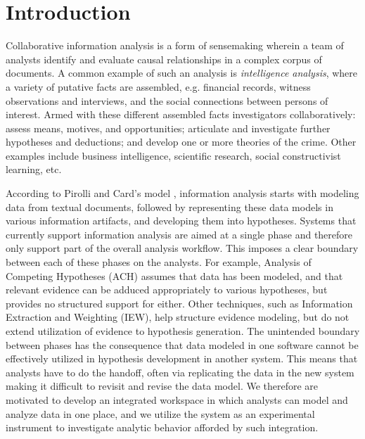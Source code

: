 \section{Introduction}\label{introduction}

Collaborative information analysis is a form of sensemaking wherein a team of analysts
identify and evaluate causal relationships in a complex corpus of documents. A
common example of such an analysis is \emph{intelligence analysis}, where a variety of putative facts are assembled, e.g.
financial records, witness observations and interviews, and the social
connections between persons of interest. Armed with these different assembled facts
 investigators collaboratively: assess means, motives,
and opportunities; articulate and investigate further hypotheses and deductions;
and develop one or more theories of the crime. Other examples include business intelligence, scientific research, social constructivist learning, etc.


According to Pirolli and Card's model \cite{Pirolli2005}, information analysis
starts with modeling data from textual documents, followed by representing these
data models in various information artifacts, and developing them into
hypotheses.  Systems that currently support information analysis are aimed at a
single phase and therefore only support part of the overall analysis workflow.
This imposes a clear boundary between each of these phases on the analysts. For
example, Analysis of Competing Hypotheses (ACH) assumes
that data has been modeled, and that relevant evidence can be adduced
appropriately to various hypotheses, but provides no structured support for
either. Other techniques, such as Information Extraction and Weighting (IEW),
help structure evidence modeling, but do not extend utilization of evidence to
hypothesis generation. The unintended boundary between phases has the
consequence that data modeled in one software cannot be effectively utilized in
hypothesis development in another system. This means that analysts have to do the handoff, often
via replicating the data in the new system making it difficult to revisit and revise the data model. We therefore
are motivated to develop an integrated workspace in which analysts can model and
analyze data in one place, and we utilize the system as an experimental
instrument to investigate analytic behavior afforded by such integration.

